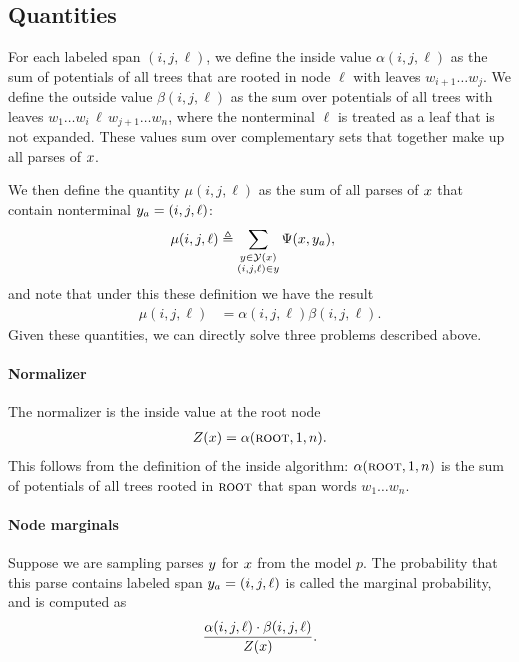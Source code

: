 \subsection{Quantities}
For each labeled span $(i, j, \ell)$, we define the inside value $\alpha(i, j, \ell)$ as the sum of potentials of all trees that are rooted in node $\ell$ with leaves $w_{i+1} \dots w_j$. We define the outside value $\beta(i, j, \ell)$ as the sum over potentials of all trees with leaves $w_1 \dots w_i \,\ell\, w_{j+1} \dots w_n$, where the nonterminal $\ell$ is treated as a leaf that is not expanded. These values sum over complementary sets that together make up all parses of $x$.


We then define the quantity $\mu(i, j, \ell)$ as the sum of all parses of $x$ that contain nonterminal $y_a = (i, j, \ell)$:
\begin{align*}
  \mu(i, j, \ell)
    &\triangleq \sum_{ \substack{ y \in \mathcal{Y}(x) \\ (i, j, \ell) \in y } } \Psi(x, y_a),
\end{align*}
and note that under this these definition we have the result
\begin{align*}
  \mu(i, j, \ell) &= \alpha(i, j, \ell) \beta(i, j, \ell).
\end{align*}
Given these quantities, we can directly solve three problems described above.

\paragraph{Normalizer}
The normalizer is the inside value at the root node
\begin{align*}
  Z(x) = \alpha(\textsc{root}, 1, n).
\end{align*}
This follows from the definition of the inside algorithm: $\alpha(\textsc{root}, 1, n)$ is the sum of potentials of all trees rooted in $\textsc{root}$ that span words $w_1 \dots w_n$.

\paragraph{Node marginals}
Suppose we are sampling parses $y$ for $x$ from the model $p$. The probability that this parse contains labeled span $y_a = (i, j, \ell)$ is called the marginal probability, and is computed as
\begin{align*}
  \frac{\alpha(i, j, \ell) \cdot \beta(i, j, \ell)}{Z(x)}.
\end{align*}

